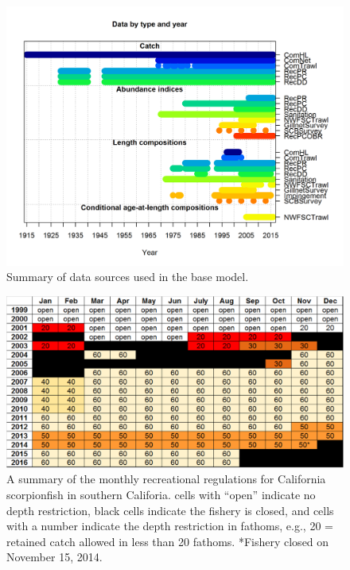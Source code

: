 \documentclass[12pt,]{article}
\begin{document}
\begin{figure}[htbp]
\centering
\includegraphics{r4ss/plots_mod1/data_plot.png}
\caption{Summary of data sources used in the base model.
\label{fig:data_plot}}
\end{figure}

\FloatBarrier

\FloatBarrier

\FloatBarrier

\begin{figure}[htbp]
\centering
\includegraphics{Figures/Rec_regs.pdf}
\caption{A summary of the monthly recreational regulations for
California scorpionfish in southern Califoria. cells with ``open''
indicate no depth restriction, black cells indicate the fishery is
closed, and cells with a number indicate the depth restriction in
fathoms, e.g., 20 = retained catch allowed in less than 20 fathoms.
*Fishery closed on November 15, 2014. \label{fig:recregs}}
\end{figure}
\end{document}
